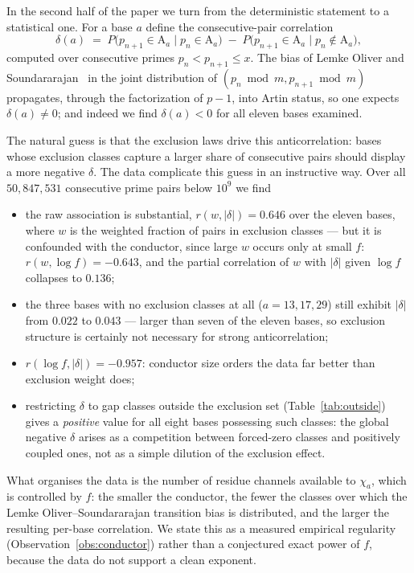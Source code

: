 \documentclass[11pt,reqno]{amsart}
\theoremstyle{plain}
\theoremstyle{definition}
\newcommand{\Art}{\mathrm{A}}
\begin{document}
In the second half of the paper we turn from the deterministic statement to a
statistical one. For a base $a$ define the consecutive-pair correlation
\begin{equation}
\label{eq:delta}
  \delta(a) \;=\; P\bigl(p_{n+1} \in \Art_a \mid p_n \in \Art_a\bigr)
             \;-\; P\bigl(p_{n+1} \in \Art_a \mid p_n \notin \Art_a\bigr),
\end{equation}
computed over consecutive primes $p_n < p_{n+1} \le x$. The bias of
Lemke Oliver and Soundararajan~\cite{LOS2016} in the joint distribution of
$(p_n \bmod m, p_{n+1} \bmod m)$ propagates, through the factorization of
$p - 1$, into Artin status, so one expects $\delta(a) \neq 0$; and indeed we
find $\delta(a) < 0$ for all eleven bases examined.

The natural guess is that the exclusion laws drive this anticorrelation: bases
whose exclusion classes capture a larger share of consecutive pairs should
display a more negative $\delta$. The data complicate this guess in an
instructive way. Over all $50{,}847{,}531$ consecutive prime pairs below
$10^9$ we find

\begin{itemize}
\item the raw association is substantial, $r(w, |\delta|) = 0.646$ over the
      eleven bases, where $w$ is the weighted fraction of pairs in exclusion
      classes --- but it is confounded with the conductor, since large $w$
      occurs only at small $f$: $r(w, \log f) = -0.643$, and the partial
      correlation of $w$ with $|\delta|$ given $\log f$ collapses to $0.136$;
\item the three bases with no exclusion classes at all ($a = 13, 17, 29$)
      still exhibit $|\delta|$ from $0.022$ to $0.043$ --- larger than seven of
      the eleven bases, so exclusion structure is certainly not necessary for
      strong anticorrelation;
\item $r(\log f, |\delta|) = -0.957$: conductor size orders the data far
      better than exclusion weight does;
\item restricting $\delta$ to gap classes outside the exclusion set
      (Table~\ref{tab:outside}) gives a \emph{positive} value for all eight
      bases possessing such classes: the global negative $\delta$ arises as a
      competition between forced-zero classes and positively coupled ones, not
      as a simple dilution of the exclusion effect.
\end{itemize}

What organises the data is the number of residue channels available to
$\chi_a$, which is controlled by $f$: the smaller the conductor, the fewer the
classes over which the Lemke Oliver--Soundararajan transition bias is
distributed, and the larger the resulting per-base correlation. We state this
as a measured empirical regularity (Observation~\ref{obs:conductor}) rather
than a conjectured exact power of $f$, because the data do not support a clean
exponent.
\end{document}
